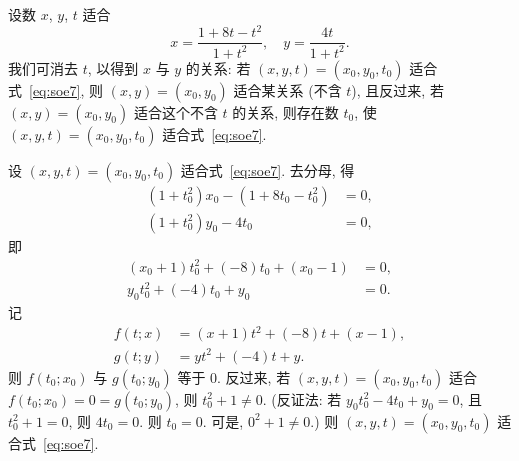 \documentclass[../libro.tex]{subfiles}
\begin{document}
\begin{example}
    设数 \(x\), \(y\), \(t\) 适合
    \begin{equation}
        x = \frac{1 + 8t - t^2}{1 + t^2},
        \quad
        y = \frac{4t}{1 + t^2}.
        \label{eq:soe7}
    \end{equation}
    我们可消去 \(t\), 以得到 \(x\) 与 \(y\) 的关系:
    若 \((x, y, t) = (x_0, y_0, t_0)\) 适合式~\eqref{eq:soe7},
    则 \((x, y) = (x_0, y_0)\) 适合某关系 (不含 \(t\)),
    且反过来,
    若 \((x, y) = (x_0, y_0)\) 适合这个不含 \(t\) 的关系,
    则存在数 \(t_0\),
    使 \((x, y, t) = (x_0, y_0, t_0)\) 适合式~\eqref{eq:soe7}.

    设 \((x, y, t) = (x_0, y_0, t_0)\) 适合式~\eqref{eq:soe7}.
    去分母, 得
    \begin{align*}
        (1 + t_0^2) x_0 - (1 + 8t_0 - t_0^2) & = 0, \\
        (1 + t_0^2) y_0 - 4t_0               & = 0,
    \end{align*}
    即
    \begin{align*}
        (x_0 + 1) t_0^2 + (-8) t_0 + (x_0 - 1) & = 0, \\
        y_0 t_0^2 + (-4) t_0 + y_0             & = 0.
    \end{align*}
    记
    \begin{align*}
        f(t; x) & = (x + 1) t^2 + (-8) t + (x - 1), \\
        g(t; y) & = y t^2 + (-4) t + y.
    \end{align*}
    则 \(f(t_0; x_0)\) 与 \(g(t_0; y_0)\)
    等于 \(0\).
    反过来,
    若 \((x, y, t) = (x_0, y_0, t_0)\) 适合
    \(f(t_0; x_0) = 0 = g(t_0; y_0)\),
    则 \(t_0^2 + 1 \neq 0\).
    (反证法: 若 \(y_0 t_0^2 - 4 t_0 + y_0 = 0\), %
    且 \(t_0^2 + 1 = 0\),
    则 \(4 t_0 = 0\).
    则 \(t_0 = 0\).
    可是, \(0^2 + 1 \neq 0\).) %
    则 \((x, y, t) = (x_0, y_0, t_0)\) 适合式~\eqref{eq:soe7}.


\end{example}
\end{document}
